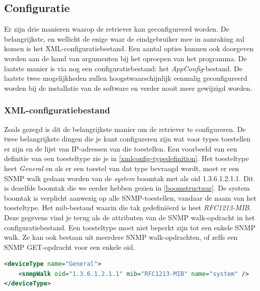 \subsection{Configuratie}
\label{snmp-data-retriever-configuratie}
Er zijn drie manieren waarop de retriever kan geconfigureerd worden. De belangrijkste,
en wellicht de enige waar de eindgebruiker mee in aanraking zal komen is het XML-configuratiebestand.
Een aantal opties kunnen ook doorgeven worden aan de hand van argumenten bij het oproepen van het programma.
De laatste manier is via nog een configuratiebestand: het \emph{AppConfig}-bestand. De laatste twee mogelijkheden
zullen hoogstwaarschijnlijk eenmalig geconfigureerd worden bij de installatie van de software en verder nooit meer gewijzigd worden.



\subsubsection{XML-configuratiebestand}
Zoals gezegd is dit de belangrijkste manier om de retriever te configureren.
De twee belangrijkste dingen die je kunt configureren zijn wat voor types toestellen er zijn en de lijst van IP-adressen van die toestellen.
Een voorbeeld van een definitie van een toesteltype zie je in \cref{xmlconfig-typedefinition}.
Het toesteltype heet \emph{General} en als er een toestel van dat type bevraagd wordt,
moet er een SNMP walk gedaan worden van de \textit{system} boomtak met als \gls{oid} 1.3.6.1.2.1.1.
Dit is dezelfde boomtak die we eerder hebben gezien in \cref{boomstructuur}.
De system boomtak is verplicht aanwezig op alle SNMP-toestellen, vandaar de naam van het toesteltype.
Het \gls{mib}-bestand waarin die tak gedefiniëerd is heet \emph{RFC1213-MIB}.
Deze gegevens vind je terug als de attributen van de SNMP walk-opdracht in het configuratiebestand.
Een toesteltype moet niet beperkt zijn tot een enkele SNMP walk. Ze kan ook bestaan uit meerdere SNMP walk-opdrachten,
of zelfs een SNMP GET-opdracht voor een enkele \gls{oid}.

\begin{lstlisting}[language=XML, float=h, caption={Definitie van een toesteltype in het XML-configuratiebestand}, label=xmlconfig-typedefinition]
<deviceType name="General">
	<snmpWalk oid="1.3.6.1.2.1.1" mib="RFC1213-MIB" name="system" />
</deviceType>
\end{lstlisting}

